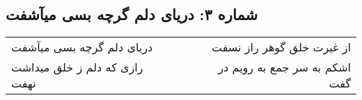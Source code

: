 \begin{center}
\section*{شماره ۳: دریای دلم گرچه بسی میآشفت}
\label{sec:003}
\begin{longtable}{l p{0.5cm} r}
دریای دلم گرچه بسی میآشفت
&&
از غیرت خلق گوهر راز نسفت
\\
رازی که دلم ز خلق میداشت نهفت
&&
اشکم به سر جمع به رویم در گفت
\\
\end{longtable}
\end{center}
